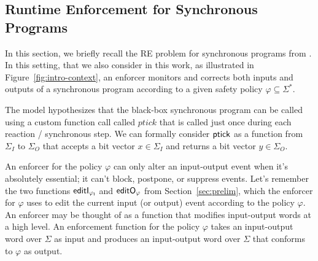 \subsection{Runtime Enforcement for Synchronous Programs}
\label{sec:problemDef}

In this section, we briefly recall the RE problem for synchronous programs from \cite{spin17}.
{In this setting, that we also consider in this work, as illustrated in Figure~\ref{fig:intro-context}, an enforcer monitors and corrects both inputs and outputs of a synchronous program according to a given safety policy $\varphi\subseteq\Sigma^*$.}

The model hypothesizes that the black-box synchronous program can be called using a custom function call called $ptick$ that is called just once during each reaction / synchronous step.
%
We can formally consider $\mathsf{ptick}$ as a function from $\Sigma_I$  to  $\Sigma_O$ that accepts a bit vector $x \in \Sigma_I$ and returns a bit vector $y \in \Sigma_O$.

An enforcer for the policy $\varphi$ can only alter an input-output event when it's absolutely essential; it can't block, postpone, or suppress events.
Let's remember the two functions $\mathsf{editI_{\varphi_I}}$ and $\mathsf{editO_{\varphi}}$ from Section~\ref{sec:prelim}, which the enforcer for $\varphi$ uses to edit the current input (or output) event according to the policy $\varphi$.
An enforcer may be thought of as a function that modifies input-output words at a high level.
An enforcement function for the policy $\varphi$ takes an input-output word over $\Sigma$ as input and produces an input-output word over $\Sigma$ that conforms to $\varphi$ as output.
%


